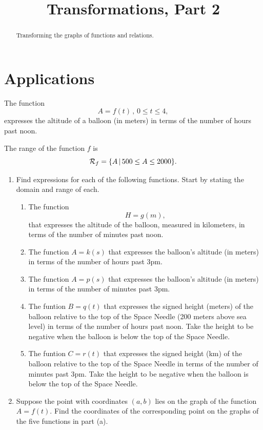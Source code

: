 \documentclass{ximera}
\title{Transformations, Part 2}
\begin{document}
\begin{abstract}
Transforming the graphs of functions and relations.
\end{abstract}
\maketitle

\section{Applications}

\begin{question} \label{Qf330zxal}
The function
\[
     A = f(t) \, , \, 0\leq t \leq 4,
\]
expresses the altitude of a balloon (in meters) in terms of the number of hours past noon.

The range of the function $f$ is
\[
 {\cal R}_f = \{ A \, | \, 500 \leq A \leq 2000  \}.
\]

\begin{enumerate}

\item Find expressions for each of the following functions. Start by stating the domain and range of each.

\begin{enumerate}
\item The function 
\[
     H = g(m) ,
\]
that expresses the altitude of the balloon, measured in kilometers, in terms of the number of minutes past noon. 

\item The function $A = k(s)$ that expresses the balloon's altitude (in meters) in terms of the number of hours past 3pm. 

\item The function $A =p(s)$ that expresses the balloon's altitude (in meters) in terms of the number of minutes past 3pm. 

\item The funtion $B = q(t)$ that expresses the signed height (meters) of the balloon relative to the top of the Space Needle (200 meters above sea level) in terms of the number of hours past noon. Take the height to be negative when the balloon is below the top of the Space Needle.

\item The funtion $C = r(t)$ that expresses the signed height (km) of the balloon relative to the top of the Space Needle in terms of the number of minutes past 3pm. Take the height to be negative when the balloon is below the top of the Space Needle.

\end{enumerate}

\item Suppose the point with coordinates $(a,b)$ lies on the graph of the function $A=f(t)$. Find the coordinates of the corresponding point on the graphs of the five functions in part (a).

\end{enumerate}
\end{question}
\end{document}
